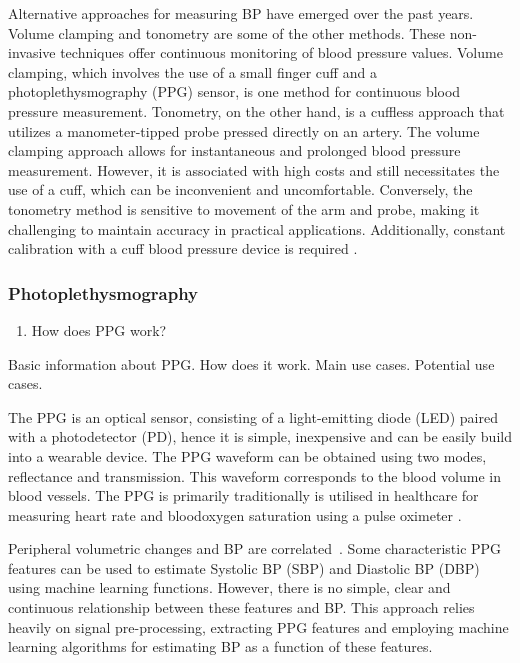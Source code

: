 \documentclass[10pt, bibliography=totoc]{scrartcl}
\begin{document}
Alternative approaches for measuring BP have emerged over the past years.
Volume clamping \cite{kimBallistocardiogramBasedApproachCuffless2018} and tonometry \cite{imholzFifteenYearsExperience1998} are some of the other methods. These non-invasive techniques offer continuous monitoring of blood pressure values. 
Volume clamping, which involves the use of a small finger cuff and a photoplethysmography (PPG) sensor, is one method for continuous blood pressure measurement. Tonometry, on the other hand, is a cuffless approach that utilizes a manometer-tipped probe pressed directly on an artery.
The volume clamping approach allows for instantaneous and prolonged blood pressure measurement. However, it is associated with high costs and still necessitates the use of a cuff, which can be inconvenient and uncomfortable. Conversely, the tonometry method is sensitive to movement of the arm and probe, making it challenging to maintain accuracy in practical applications. Additionally, constant calibration with a cuff blood pressure device is required \cite{peterReviewMethodsNoninvasive2014}.

\subsubsection{Photoplethysmography}

\begin{enumerate}
\item How does PPG work?
\end{enumerate}

Basic information about PPG. How does it work. Main use cases. Potential use cases.

The PPG is an optical sensor, consisting of a light-emitting diode (LED) paired with a photodetector (PD), hence it is simple, inexpensive and can be easily build into a wearable device. The PPG waveform can be obtained using two modes, reflectance and transmission. This waveform corresponds to the blood volume in blood vessels. The PPG is primarily traditionally is utilised in healthcare for measuring heart rate and bloodoxygen saturation using a pulse oximeter \cite{allenPhotoplethysmographyItsApplication2007}.

Peripheral volumetric changes and BP are correlated~\cite{langewoutersPressurediameterRelationshipsSegments1986}.
Some characteristic PPG features can be used to estimate Systolic BP (SBP) and Diastolic BP (DBP) using machine learning functions. However, there is no simple, clear and continuous relationship between these features and BP. This approach relies heavily on signal pre-processing, extracting PPG features and employing machine learning algorithms for estimating BP as a function of these features.
\end{document}
